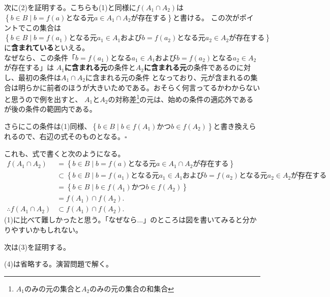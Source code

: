 \documentclass[a4j,dvipdfmx]{jsarticle}
\begin{document}
次に(2)を証明する。こちらも(1)と同様に$f(A_1\cap A_2)$は$\left\{b\in B\mid \text{$b=f(a)$となる元$a\in A_1 \cap A_2$が存在する}\right\}$と書ける。
この次がポイントでこの集合は\\
$\left\{b\in B\mid \text{$b=f(a_1)$となる元$a_1\in A_1$および$b=f(a_2)$となる元$a_2 \in A_2$が存在する}\right\}$\\
に\textbf{含まれている}といえる。\\なぜなら、この条件「$b=f(a_1)$となる$a_1\in A_1$および$b=f(a_2)$となる$a_2\in A_2$が存在する」は
\textbf{$A_1$に含まれる元}の条件と\textbf{$A_2$に含まれる元}の条件であるのに対し、最初の条件は$A_1\cap A_2$に含まれる元の条件
となっており、元が含まれるの集合は明らかに前者のほうが大きいためである。おそらく何言ってるかわからないと思うので例を出すと、
$A_1$と$A_2$の対称差\footnote{$A_1$のみの元の集合と$A_2$のみの元の集合の和集合}の元は、始めの条件の適応外であるが後の条件の範囲内である。

さらにこの条件は(1)同様、$\left\{b\in B\mid b\in f(A_1)\text{かつ}b\in f(A_2)\right\}$と書き換えられるので、右辺の式そのものとなる。$\square$

これも、式で書くと次のようになる。
\begin{align*}
    f(A_1\cap A_2)&=\left\{b\in B\mid \text{$b=f(a)$となる元$a\in A_1 \cap A_2$が存在する}\right\}\\
    &\subset\left\{b\in B\mid \text{$b=f(a_1)$となる元$a_1\in A_1$および$b=f(a_2)$となる元$a_2 \in A_2$が存在する}\right\}\\
    &=\left\{b\in B\mid b\in f(A_1)\text{かつ} b\in f(A_2)\right\}\\
    &=f(A_1)\cap f(A_2).\\
    \therefore f(A_1\cap A_2)&\subset f(A_1)\cap f(A_2).
\end{align*}
(1)に比べて難しかったと思う。「なぜなら...」のところは図を書いてみると分かりやすいかもしれない。

次は(3)を証明する。

(4)は省略する。演習問題で解く。
\end{document}
